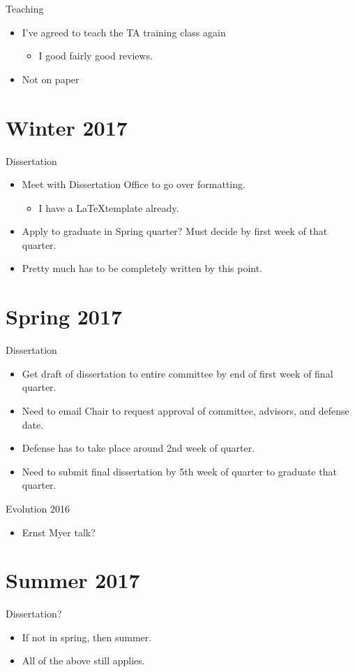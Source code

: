 \documentclass{article}
\begin{document}
Teaching
\begin{itemize}
  \item I've agreed to teach the TA training class again
    \begin{itemize}
      \item I good fairly good reviews.
    \end{itemize}
  \item Not on paper
\end{itemize}


\section{Winter 2017}
Dissertation
\begin{itemize}
  \item Meet with Dissertation Office to go over formatting. 
    \begin{itemize}
      \item I have a \LaTeX template already.
    \end{itemize}
  \item Apply to graduate in Spring quarter? Must decide by first week of that quarter.
  \item Pretty much has to be completely written by this point.
\end{itemize}


\section{Spring 2017}
Dissertation
\begin{itemize}
  \item Get draft of dissertation to entire committee by end of first week of final quarter.
  \item Need to email Chair to request approval of committee, advisors, and defense date.
  \item Defense has to take place around 2nd week of quarter.
  \item Need to submit final dissertation by 5th week of quarter to graduate that quarter.
\end{itemize}

Evolution 2016
\begin{itemize}
  \item Ernst Myer talk?
\end{itemize}


\section{Summer 2017}
Dissertation?
\begin{itemize}
  \item If not in spring, then summer.
  \item All of the above still applies.
\end{itemize}
\end{document}
